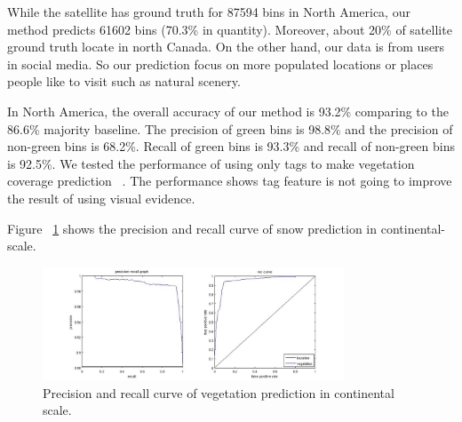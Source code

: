 
While the satellite has ground truth for 87594 bins in North America, our method predicts 61602 bins (70.3\% in quantity). Moreover, about 20\% of satellite ground truth locate in north Canada. On the other hand, our data is from users in social media. So our prediction focus on more populated locations or places people like to visit such as natural scenery.

In North America, the overall accuracy of our method is 93.2\% comparing to the 86.6\% majority baseline. The precision of green bins is 98.8\% and the precision of non-green bins is 68.2\%. Recall of green bins is 93.3\% and recall of non-green bins is 92.5\%. We tested the performance of using only tags to make vegetation coverage prediction ~\cite{ecology2012www}. The performance shows tag
feature is not going to improve the result of using visual evidence.


Figure ~\ref{fig:curvevege} shows the precision and recall curve of snow prediction in continental-scale.
\begin{figure}
\begin{center}

\includegraphics[width=0.80\textwidth]{curvevege.jpg}


\end{center}
\vspace{-24pt}
\caption{Precision and recall curve of vegetation prediction in continental scale.}
\label{fig:curvevege}
\vspace{-12pt}
\end{figure}

%
%
%


